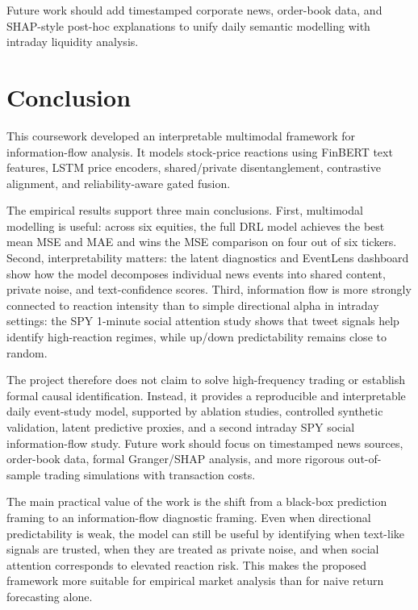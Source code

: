 \documentclass[12pt, a4paper]{article}
\begin{document}
Future work should add timestamped corporate news, order-book data, and SHAP-style post-hoc explanations to unify daily semantic modelling with intraday liquidity analysis.

\section{Conclusion}
\label{sec:conclusion}

This coursework developed an interpretable multimodal framework for information-flow analysis. It models stock-price reactions using FinBERT text features, LSTM price encoders, shared/private disentanglement, contrastive alignment, and reliability-aware gated fusion.

The empirical results support three main conclusions. First, multimodal modelling is useful: across six equities, the full DRL model achieves the best mean MSE and MAE and wins the MSE comparison on four out of six tickers. Second, interpretability matters: the latent diagnostics and EventLens dashboard show how the model decomposes individual news events into shared content, private noise, and text-confidence scores. Third, information flow is more strongly connected to reaction intensity than to simple directional alpha in intraday settings: the SPY 1-minute social attention study shows that tweet signals help identify high-reaction regimes, while up/down predictability remains close to random.

The project therefore does not claim to solve high-frequency trading or establish formal causal identification. Instead, it provides a reproducible and interpretable daily event-study model, supported by ablation studies, controlled synthetic validation, latent predictive proxies, and a second intraday SPY social information-flow study. Future work should focus on timestamped news sources, order-book data, formal Granger/SHAP analysis, and more rigorous out-of-sample trading simulations with transaction costs.

The main practical value of the work is the shift from a black-box prediction framing to an information-flow diagnostic framing. Even when directional predictability is weak, the model can still be useful by identifying when text-like signals are trusted, when they are treated as private noise, and when social attention corresponds to elevated reaction risk. This makes the proposed framework more suitable for empirical market analysis than for naive return forecasting alone.
\end{document}
